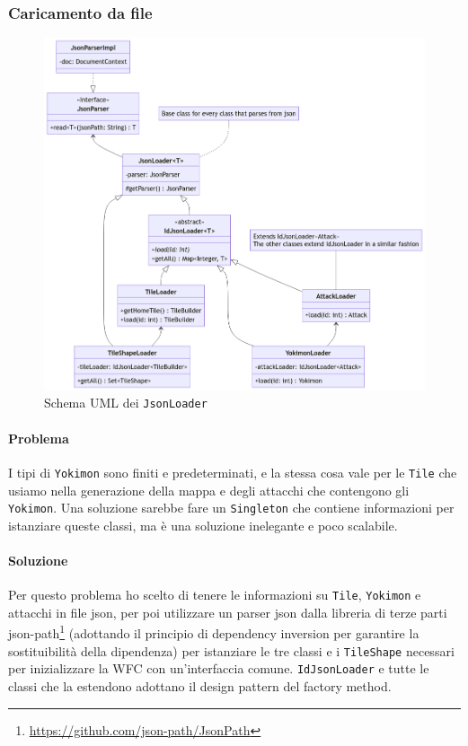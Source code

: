 \documentclass[a4paper,12pt]{report}
\begin{document}
\subsubsection{Caricamento da file}
\begin{figure}[H]
\centering{}
\includegraphics[width=1.0\columnwidth]{images/uml-loaders.png}
\caption{Schema UML dei \texttt{JsonLoader}}
\label{img:uml-loaders}
\end{figure}
\paragraph{Problema} I tipi di \texttt{Yokimon} sono finiti e predeterminati, e la stessa cosa vale per le \texttt{Tile} che usiamo nella generazione della mappa e degli attacchi che contengono gli \texttt{Yokimon}. 
%
Una soluzione sarebbe fare un \texttt{Singleton} che contiene informazioni per istanziare queste classi, ma è una soluzione inelegante e poco scalabile.
\paragraph{Soluzione} Per questo problema ho scelto di tenere le informazioni su \texttt{Tile}, \texttt{Yokimon} e attacchi in file json, per poi utilizzare un parser json dalla libreria di terze parti json-path\footnote{\url{https://github.com/json-path/JsonPath}} (adottando il principio di dependency inversion per garantire la sostituibilità della dipendenza) per istanziare le tre classi e i \texttt{TileShape} necessari per inizializzare la WFC con un’interfaccia comune. 
%
\texttt{IdJsonLoader} e tutte le classi che la estendono adottano il design pattern del factory method.
\end{document}

